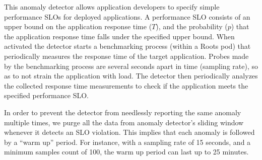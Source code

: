 This anomaly detector
allows application developers to specify simple performance SLOs for deployed applications. A
performance SLO consists of an upper bound on the application response time ($T$), and the probability ($p$)
that the application response time falls under the specified upper bound. 
When activated the detector starts a benchmarking process (within a Roots pod)
that periodically measures the response time of the target application. Probes made by the benchmarking 
process are several seconds apart in time (sampling rate), so as to not strain the application with load.
The detector then periodically
analyzes the collected response time measurements to check if the application meets the specified performance
SLO. 



In order to prevent the detector from needlessly reporting the same anomaly multiple times,
we purge all the data from anomaly detector's sliding window whenever it detects an SLO violation.
This implies that each anomaly is followed by a ``warm up'' period.
For instance, with a sampling rate of 15 seconds, and a minimum
samples count of 100, the warm up period can last up to 25 minutes.

